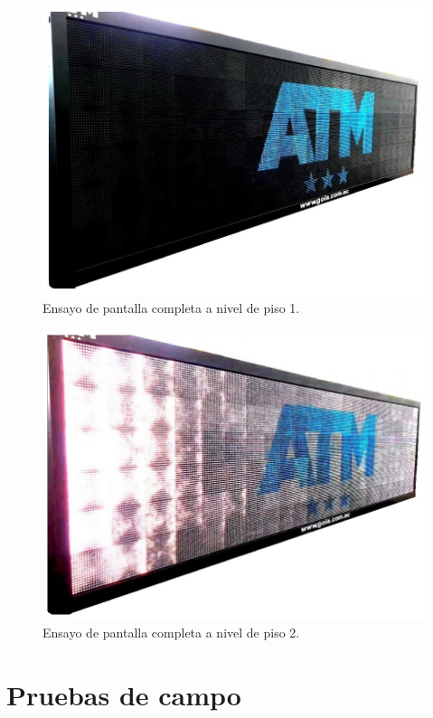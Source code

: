 \begin{figure}[htpb]
	\centering
	\includegraphics[scale=0.6]{Figures/vmsfc8m.jpg} 
	\caption{Ensayo de pantalla completa a nivel de piso 1.}
	\label{fig: pantallacompletasobrepiso1}
\end{figure}



\begin{figure}[htpb]
	\centering
	\includegraphics[scale=0.6]{Figures/vmsfc8m1.jpg}
	\caption{Ensayo de pantalla completa a nivel de piso 2.}
	\label{fig: pantallacompletasobrepiso2}
\end{figure}
 


\section{Pruebas de campo}

